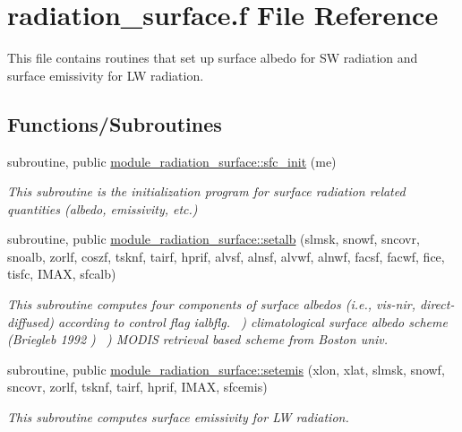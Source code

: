 \hypertarget{radiation__surface_8f}{}\section{radiation\+\_\+surface.\+f File Reference}
\label{radiation__surface_8f}


This file contains routines that set up surface albedo for SW radiation and surface emissivity for LW radiation.  


\subsection*{Functions/\+Subroutines}
\textbf{ }\par
\begin{DoxyCompactItemize}
\item 
subroutine, public \hyperlink{group__module__radiation__surface_gac05a5b8f903ace95e45c1cce612ed721}{module\+\_\+radiation\+\_\+surface\+::sfc\+\_\+init} (me)
\begin{DoxyCompactList}\small\item\em This subroutine is the initialization program for surface radiation related quantities (albedo, emissivity, etc.) \end{DoxyCompactList}\item 
subroutine, public \hyperlink{group__module__radiation__surface_ga3e3bd6550a924c538c88169c7c169a5b}{module\+\_\+radiation\+\_\+surface\+::setalb} (slmsk, snowf, sncovr, snoalb, zorlf, coszf, tsknf, tairf, hprif, alvsf, alnsf, alvwf, alnwf, facsf, facwf, fice, tisfc, I\+M\+AX, sfcalb)
\begin{DoxyCompactList}\small\item\em This subroutine computes four components of surface albedos (i.\+e., vis-\/nir, direct-\/diffused) according to control flag ialbflg. ~) climatological surface albedo scheme (Briegleb 1992 \cite{briegleb_1992}) ~) M\+O\+D\+IS retrieval based scheme from Boston univ. \end{DoxyCompactList}\item 
subroutine, public \hyperlink{group__module__radiation__surface_ga57ea2aa09c4194e14f2c538ef7fad7b3}{module\+\_\+radiation\+\_\+surface\+::setemis} (xlon, xlat, slmsk, snowf, sncovr, zorlf, tsknf, tairf, hprif, I\+M\+AX, sfcemis)
\begin{DoxyCompactList}\small\item\em This subroutine computes surface emissivity for LW radiation. \end{DoxyCompactList}\end{DoxyCompactItemize}


